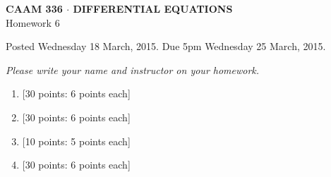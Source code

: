 \documentclass[10pt]{article}
\begin{document}
\vspace*{-5em}
\begin{center}
\large \textsf{\textbf{CAAM 336 $\cdot$ DIFFERENTIAL EQUATIONS}\\[0.5em]
Homework 6 }
\end{center}

Posted Wednesday 18 March, 2015.  Due 5pm Wednesday 25 March, 2015.

\begin{center}
\emph{Please write your name and instructor on your homework.}
\end{center}

\begin{enumerate}
\item {[30 points: 6 points each]}\\  
\newpage
\item {[30 points: 6 points each]}\\  
\newpage
\item {[10 points: 5 points each]}\\  
\newpage
\item {[30 points: 6 points each]}  
\end{enumerate}
\end{document}
